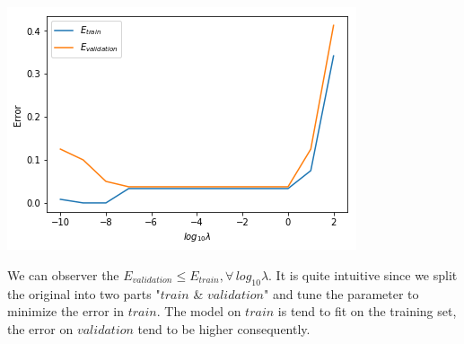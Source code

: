 \documentclass[a4paper,12pt]{article}
\begin{document}
\section{}
  \begin{minipage}{\linewidth}
      \begin{minipage}{0.6\linewidth}
\raggedright
\includegraphics[scale=0.7]{Q8.png}
      \end{minipage}
      \hspace{0.05\linewidth}
      \begin{minipage}{0.4\linewidth}
         We can observer the $E_{validation} \leq E_{train}, \forall \, log_{10} \lambda$. It is quite intuitive since we split the original into two parts "$train$ \& $validation$" and tune the parameter to minimize the error in $train$. The model on $train$ is tend to fit on the training set, the error on $validation$ tend to be higher consequently.
      \end{minipage}
  \end{minipage}

\newpage
\end{document}
